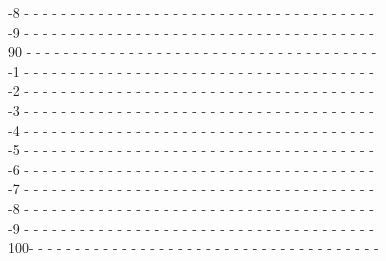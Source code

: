 \documentclass{cmspaper}
\begin{document}
{\begin{flushleft}
-8 - - - - - - - - - - - - - - - - - - - - - - - - - - - - - - - - - - - - - -\\
-9 - - - - - - - - - - - - - - - - - - - - - - - - - - - - - - - - - - - - - -\\
90 - - - - - - - - - - - - - - - - - - - - - - - - - - - - - - - - - - - - - -\\
-1 - - - - - - - - - - - - - - - - - - - - - - - - - - - - - - - - - - - - - -\\
-2 - - - - - - - - - - - - - - - - - - - - - - - - - - - - - - - - - - - - - -\\
-3 - - - - - - - - - - - - - - - - - - - - - - - - - - - - - - - - - - - - - -\\
-4 - - - - - - - - - - - - - - - - - - - - - - - - - - - - - - - - - - - - - -\\
-5 - - - - - - - - - - - - - - - - - - - - - - - - - - - - - - - - - - - - - -\\
-6 - - - - - - - - - - - - - - - - - - - - - - - - - - - - - - - - - - - - - -\\
-7 - - - - - - - - - - - - - - - - - - - - - - - - - - - - - - - - - - - - - -\\
-8 - - - - - - - - - - - - - - - - - - - - - - - - - - - - - - - - - - - - - -\\
-9 - - - - - - - - - - - - - - - - - - - - - - - - - - - - - - - - - - - - - -\\
100- - - - - - - - - - - - - - - - - - - - - - - - - - - - - - - - - - - - - -\\
\end{flushleft} }
\end{document}
